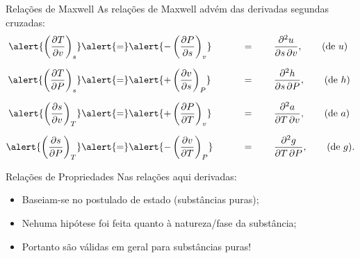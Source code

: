     \begin{frame}{Relações de Maxwell}\vspace*{-0em}
        As relações de Maxwell advém das derivadas segundas cruzadas:
        \begin{alignat*}{2}
            \alert{\left(\frac{\partial T}{\partial v}\right)_s}    &\alert{=}
            \alert{-\left(\frac{\partial P}{\partial s}\right)_v}   &  \qquad &=
            \qquad\frac{\partial^2 u}{\partial s\,\partial v},
            \qquad\mbox{(de $u$)}
            \\[\medskipamount]
            \alert{\left(\frac{\partial T}{\partial P}\right)_s}    &\alert{=}
            \alert{+\left(\frac{\partial v}{\partial s}\right)_P}   & &=
            \qquad\frac{\partial^2 h}{\partial s\,\partial P},
            \qquad\mbox{(de $h$)}
            \\[\medskipamount]
            \alert{\left(\frac{\partial s}{\partial v}\right)_T}    &\alert{=}
            \alert{+\left(\frac{\partial P}{\partial T}\right)_v}   & &=
            \qquad\frac{\partial^2 a}{\partial T\,\partial v},
            \qquad\mbox{(de $a$)}
            \\[\medskipamount]
            \alert{\left(\frac{\partial s}{\partial P}\right)_T}    &\alert{=}
            \alert{-\left(\frac{\partial v}{\partial T}\right)_P}   & &=
            \qquad\frac{\partial^2 g}{\partial T\,\partial P},
            \qquad\mbox{(de $g$)}.
        \end{alignat*}
    \end{frame}

    \begin{frame}{Relações de Propriedades}\vspace*{-1em}
        Nas relações aqui derivadas: \vspace*\bigskipamount

        \begin{itemize}
            \item<1-> Baseiam-se no postulado de estado (\alert{substâncias puras});
                \vspace*\medskipamount
            \item<1-> \alert{Nehuma hipótese} foi feita quanto à \alert{natureza/fase da
                substância};
                \vspace*\medskipamount
            \item<1-> Portanto são \alert{válidas em geral} para substâncias puras!
        \end{itemize}
    \end{frame}

